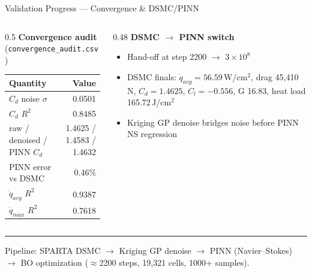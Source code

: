 \documentclass[aspectratio=169,10pt]{beamer}
\begin{document}
\begin{frame}{Validation Progress --- Convergence \& DSMC/PINN}
  \begin{columns}[T]
    \begin{column}{0.5\textwidth}
      \textbf{Convergence audit} (\texttt{convergence\_audit.csv})\\[2pt]
      \scriptsize
      \begin{tabular}{@{}lr@{}}
        \toprule
        Quantity & Value \\
        \midrule
        $C_d$ noise $\sigma$ & 0.0501 \\
        $C_d$ $R^2$ & 0.8485 \\
        raw / denoised / PINN $C_d$ & 1.4625 / 1.4583 / 1.4632 \\
        PINN error vs DSMC & 0.46\% \\
        $\dot{q}_{avg}$ $R^2$ & 0.9387 \\
        $\dot{q}_{max}$ $R^2$ & 0.7618 \\
        \bottomrule
      \end{tabular}
    \end{column}
    \begin{column}{0.48\textwidth}
      \textbf{DSMC $\rightarrow$ PINN switch}\\[2pt]
      \begin{itemize}\scriptsize
        \item Hand-off at step 2200 $\rightarrow$ $3\times10^{8}$
        \item DSMC finals: $\dot{q}_{avg}=56.59$\,W/cm$^2$,
              drag 45{,}410\,N, $C_d=1.4625$, $C_l=-0.556$,
              G 16.83, heat load 165.72\,J/cm$^2$
        \item Kriging GP denoise bridges noise before PINN NS
              regression
      \end{itemize}
    \end{column}
  \end{columns}
  \vspace{4pt}
  \hrule
  \vspace{2pt}
  {\footnotesize Pipeline: SPARTA DSMC $\rightarrow$ Kriging GP denoise
  $\rightarrow$ PINN (Navier--Stokes) $\rightarrow$ BO optimization
  ($\approx$2200 steps, 19{,}321 cells, 1000+ samples).}
\end{frame}

\end{document}
